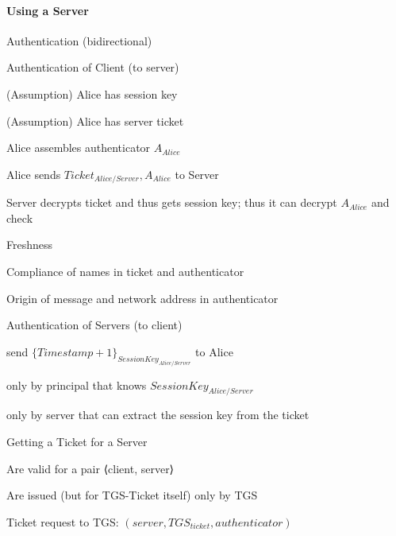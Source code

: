 \documentclass[a4paper]{article}
\begin{document}
\begin{multicols}{3}
    \paragraph{Using a Server}
    Authentication (bidirectional)
    \begin{enumerate*}
        \item Authentication of Client (to server)
        \begin{itemize*}
            \item (Assumption) Alice has session key
            \item (Assumption) Alice has server ticket
        \end{itemize*}
        \begin{enumerate*}
            \item Alice assembles authenticator $A_{Alice}$ %
            \item Alice sends $Ticket_{Alice/Server}, A_{Alice}$ to Server
            \item Server decrypts ticket and thus gets session key; thus it can decrypt $A_{Alice}$ and check
            \begin{itemize*}
                \item Freshness
                \item Compliance of names in ticket and authenticator
                \item Origin of message and network address in authenticator
            \end{itemize*}
        \end{enumerate*}
        \item Authentication of Servers (to client)
        \begin{itemize*}
            \item send $\{Timestamp+1\}_{SessionKey_{Alice/Server}}$ to Alice
            \item only by principal that knows $SessionKey_{Alice/Server}$
            \item only by server that can extract the session key from the ticket %
        \end{itemize*}
    \end{enumerate*}

    Getting a Ticket for a Server
    \begin{itemize*}
        \item Are valid for a pair ⟨client, server⟩
        \item Are issued (but for TGS-Ticket itself) only by TGS
        \item Ticket request to TGS: $(server, TGS_{ticket}, authenticator)$
    \end{itemize*}


\end{multicols}
\end{document}
